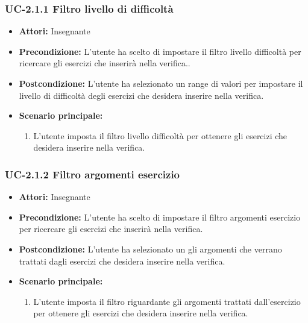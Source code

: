\subsubsection{UC-2.1.1 Filtro livello di difficoltà}
\begin{itemize}
		\item \textbf{Attori: } Insegnante
		
		\item \textbf{Precondizione: }L'utente ha scelto di impostare il filtro livello difficoltà per ricercare gli esercizi che inserirà nella verifica..
		\item \textbf{Postcondizione: }L'utente ha selezionato un range di valori per impostare il livello di difficoltà degli esercizi che desidera inserire nella verifica.
		\item \textbf{Scenario principale: }
		\begin{enumerate}
		\item L'utente imposta il filtro livello difficoltà per ottenere gli esercizi che desidera inserire nella verifica.
		\end{enumerate}
\end{itemize}
\subsubsection{UC-2.1.2 Filtro argomenti esercizio}
\begin{itemize}
		\item \textbf{Attori: } Insegnante
		
		\item \textbf{Precondizione: }L'utente ha scelto di impostare il filtro argomenti esercizio per ricercare gli esercizi che inserirà nella verifica.
		\item \textbf{Postcondizione: }L'utente ha selezionato un gli argomenti che verrano trattati dagli esercizi che desidera inserire nella verifica.
		\item \textbf{Scenario principale: }
		\begin{enumerate}
		\item L'utente imposta il filtro riguardante gli argomenti trattati dall'esercizio per ottenere gli esercizi che desidera inserire nella verifica.
		\end{enumerate}
\end{itemize}
